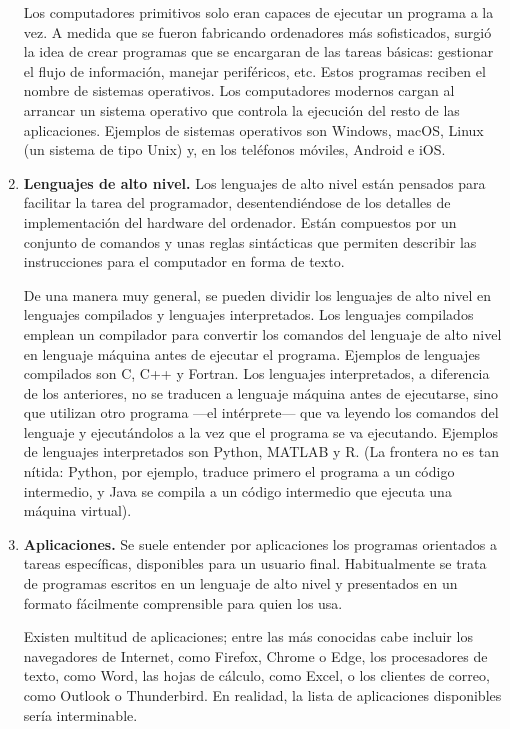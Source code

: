 \begin{paracol}{2}
\begin{enumerate}
Los computadores primitivos solo eran capaces de ejecutar un programa a la vez. A medida que se fueron fabricando ordenadores más sofisticados, surgió la idea de crear programas que se encargaran de las tareas básicas: gestionar el flujo de información, manejar periféricos, etc. Estos programas reciben el nombre de sistemas operativos. Los computadores modernos cargan al arrancar un sistema operativo que controla la ejecución del resto de las aplicaciones. Ejemplos de sistemas operativos son Windows, macOS, Linux (un sistema de tipo Unix) y, en los teléfonos móviles, Android e iOS.

\item \textbf{Lenguajes de alto nivel.} 
Los lenguajes de alto nivel están pensados para facilitar la tarea del programador, desentendiéndose de los detalles de implementación del hardware del ordenador. Están compuestos por un conjunto de comandos y unas reglas sintácticas que permiten describir las instrucciones para el computador en forma de texto.

De una manera muy general, se pueden dividir los lenguajes de alto nivel en lenguajes compilados y lenguajes interpretados. Los lenguajes compilados emplean un compilador para convertir los comandos del lenguaje de alto nivel en lenguaje máquina antes de ejecutar el programa. Ejemplos de lenguajes compilados son C, C++ y Fortran. Los lenguajes interpretados, a diferencia de los anteriores, no se traducen a lenguaje máquina antes de ejecutarse, sino que utilizan otro programa ---el intérprete--- que va leyendo los comandos del lenguaje y ejecutándolos a la vez que el programa se va ejecutando. Ejemplos de lenguajes interpretados son Python, MATLAB y R. (La frontera no es tan nítida: Python, por ejemplo, traduce primero el programa a un código intermedio, y Java se compila a un código intermedio que ejecuta una máquina virtual).

\item \textbf{Aplicaciones.}  Se suele entender por aplicaciones los programas orientados a tareas específicas, disponibles para un usuario final. Habitualmente se trata de programas escritos en un lenguaje de alto nivel y presentados en un formato fácilmente comprensible para quien los usa.

Existen multitud de aplicaciones; entre las más conocidas cabe incluir los navegadores de Internet, como Firefox, Chrome o Edge, los procesadores de texto, como Word, las hojas de cálculo, como Excel, o los clientes de correo, como Outlook o Thunderbird. En realidad, la lista de aplicaciones disponibles sería interminable.
\end{enumerate}


\end{paracol}
